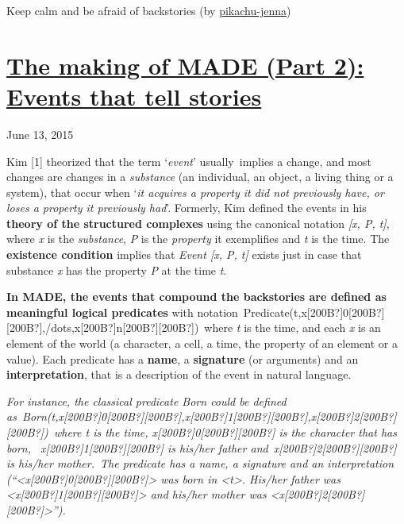 \documentclass[a4paper]{article}
\newcommand\textstyleStrongEmphasis[1]{\textbf{#1}}
\newcommand\textstyleEmphasis[1]{\textit{#1}}
\begin{document}
Keep calm and be afraid of backstories (by
\href{http://pikachu-jenna.deviantart.com/}{pikachu-jenna})


\bigskip

\clearpage\section[The making of MADE (Part 2): Events that tell
stories]{\href{http://www.velonuboso.com/made/2015/06/13/making-part-2-events-tells-stories/}{The
making of MADE (Part 2): Events that tell stories}}
June 13, 2015

Kim [1] theorized that the term
{\textquoteleft}\textstyleEmphasis{event}{\textquoteright}
usually~implies a change, and most changes are changes in a
\textstyleEmphasis{substance} (an individual, an object, a living thing
or a system), that occur when {\textquoteleft}\textstyleEmphasis{it
acquires a property it did not previously have, or loses a property it
previously had}{\textquoteright}. Formerly, Kim defined the events in
his \textstyleStrongEmphasis{theory of the structured complexes} using
the canonical notation \textstyleEmphasis{[x, P, t]}, where
\textstyleEmphasis{x} is the \textstyleEmphasis{substance},
\textstyleEmphasis{P} is the \textstyleEmphasis{property} it
exemplifies and \textstyleEmphasis{t} is the time. The
\textstyleStrongEmphasis{existence condition} implies that
\textstyleEmphasis{Event [x, P, t]} exists just in case that substance
\textstyleEmphasis{x} has the property \textstyleEmphasis{P} at the
time \textstyleEmphasis{t}.

\textstyleStrongEmphasis{In MADE, the events that compound the
backstories are defined as meaningful logical predicates} with
notation~Predicate(t,x[200B?]0[200B?][200B?],/dots,x[200B?]n[200B?][200B?])~where
\textstyleEmphasis{t} is the time, and each \textstyleEmphasis{x} is an
element of the world (a character, a cell, a time, the property of an
element or a value). Each predicate has a
\textstyleStrongEmphasis{name}, a \textstyleStrongEmphasis{signature}
(or arguments) and an \textstyleStrongEmphasis{interpretation}, that is
a description of the event in natural language.

\textstyleEmphasis{For instance, the classical predicate Born could be
defined
as~Born(t,x[200B?]0[200B?][200B?],x[200B?]1[200B?][200B?],x[200B?]2[200B?][200B?])~where
t is the time, x[200B?]0[200B?][200B?] is the character that has born,
~x[200B?]1[200B?][200B?] is his/her father and~x[200B?]2[200B?][200B?]
is his/her mother.~The predicate has a name, a signature and an
interpretation
({\textquotedblleft}{\textless}x[200B?]0[200B?][200B?]{\textgreater}
was born in {\textless}t{\textgreater}. His/her father was
{\textless}x[200B?]1[200B?][200B?]{\textgreater} and his/her mother was
{\textless}x[200B?]2[200B?][200B?]{\textgreater}{\textquotedblright}).}
\end{document}
